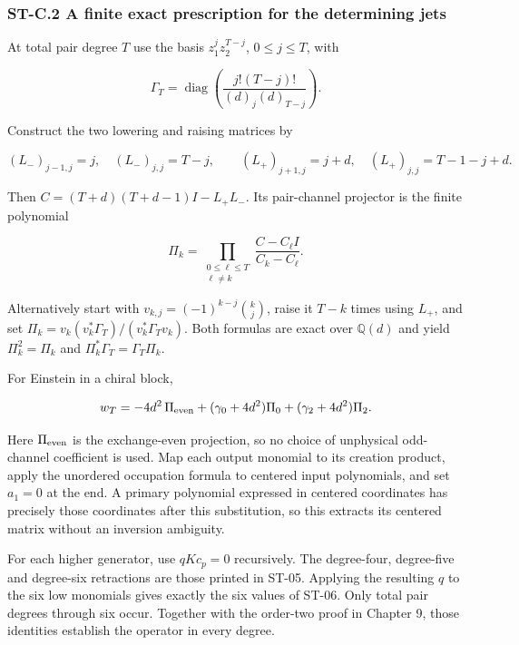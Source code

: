 \documentclass[a4paper,11pt]{article}
\numberwithin{equation}{section}
\begin{document}
\hypertarget{st-c.2-a-finite-exact-prescription-for-the-determining-jets}{%
\subsubsection{ST-C.2 A finite exact prescription for the determining jets}\label{st-c.2-a-finite-exact-prescription-for-the-determining-jets}}

At total pair degree \(T\) use the basis \(z_1^jz_2^{T-j}\), \(0\leq j\leq T\), with

\[
\Gamma_T=\operatorname{diag}\left(
\frac{j!(T-j)!}{(d)_j(d)_{T-j}}\right).
\]

Construct the two lowering and raising matrices by

\[
(L_-)_{j-1,j}=j,\quad (L_-)_{j,j}=T-j,
\qquad
(L_+)_{j+1,j}=j+d,\quad (L_+)_{j,j}=T-1-j+d.
\]

Then \(C=(T+d)(T+d-1)I-L_+L_-\). Its pair-channel projector is the finite polynomial

\[
\Pi_k=\prod_{\substack{0\leq\ell\leq T\\\ell\ne k}}
\frac{C-C_\ell I}{C_k-C_\ell}.
\]

Alternatively start with \(v_{k,j}=(-1)^{k-j}\binom kj\), raise it \(T-k\) times using \(L_+\), and set \(\Pi_k=v_k(v_k^*\Gamma_T)/(v_k^*\Gamma_Tv_k)\). Both formulas are exact over \(\mathbb Q(d)\) and yield \(\Pi_k^2=\Pi_k\) and \(\Pi_k^*\Gamma_T=\Gamma_T\Pi_k\).

For Einstein in a chiral block,

\[
w_T=-4d^2\,\Pi_{\rm even}
+(\gamma_0+4d^2)\Pi_0+(\gamma_2+4d^2)\Pi_2.
\]

Here \(\Pi_{\rm even}\) is the exchange-even projection, so no choice of unphysical odd-channel coefficient is used. Map each output monomial to its creation product, apply the unordered occupation formula to centered input polynomials, and set \(a_1=0\) at the end. A primary polynomial expressed in centered coordinates has precisely those coordinates after this substitution, so this extracts its centered matrix without an inversion ambiguity.

For each higher generator, use \(qKc_p=0\) recursively. The degree-four, degree-five and degree-six retractions are those printed in ST-05. Applying the resulting \(q\) to the six low monomials gives exactly the six values of ST-06. Only total pair degrees through six occur. Together with the order-two proof in Chapter 9, those identities establish the operator in every degree.
\end{document}
